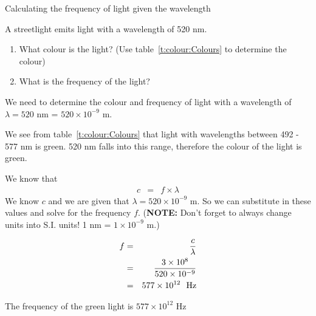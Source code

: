 \begin{wex}{Calculating the frequency of light given the wavelength}
{A streetlight emits light with a wavelength of 520 nm.
\begin{enumerate}
\item What colour is the light? (Use table~\ref{t:colour:Colours} to determine the colour)
\item What is the frequency of the light? 
\end{enumerate}
}
{
We need to determine the colour and frequency of light with a wavelength of $\lambda = 520$ nm = $520 \times 10^{-9}$ m.

We see from table~\ref{t:colour:Colours} that light with wavelengths between 492 - 577 nm is green. 520 nm falls into this range, therefore the colour of the light is green.

We know that 
\begin{eqnarray*}
c &=& f \times \lambda 
\end{eqnarray*}
We know $c$ and we are given that $\lambda = 520 \times 10^{-9}$ m. So we can substitute in these values and solve for the frequency $f$.
(\textbf{NOTE:} Don't forget to always change units into S.I. units! 1 nm = $1 \times 10^{-9}$ m.)

\begin{eqnarray*}
f &=& \frac{c}{\lambda} \\
 & = & \frac{3 \times 10^{8}}{520 \times 10^{-9}} \\
 & = & 577 \times 10^{12}~~\rm{Hz}
\end{eqnarray*}

The frequency of the green light is $577 \times 10^{12}$ Hz
}
\end{wex}


